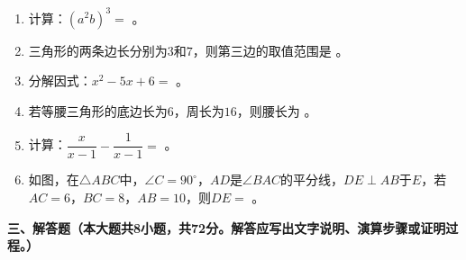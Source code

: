 \documentclass[12pt, a4paper]{ctexart}
\begin{document}
\begin{enumerate}[label=\arabic*., start=11]

\item 计算：$(a^{2}b)^{3}=$ \underline{\hspace{3cm}} 。

\item 三角形的两条边长分别为$3$和$7$，则第三边的取值范围是 \underline{\hspace{3cm}} 。

\item 分解因式：$x^{2}-5x+6=$ \underline{\hspace{3cm}} 。

\item 若等腰三角形的底边长为$6$，周长为$16$，则腰长为 \underline{\hspace{3cm}} 。

\item 计算：$\dfrac{x}{x-1}-\dfrac{1}{x-1}=$ \underline{\hspace{3cm}} 。

\item 如图，在$\triangle ABC$中，$\angle C=90^{\circ}$，$AD$是$\angle BAC$的平分线，$DE\perp AB$于$E$，若$AC=6$，$BC=8$，$AB=10$，则$DE=$ \underline{\hspace{3cm}} 。

\end{enumerate}

\vspace{0.5cm}

{\large\bfseries 三、解答题（本大题共8小题，共72分。解答应写出文字说明、演算步骤或证明过程。）}
\end{document}
